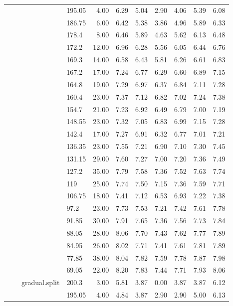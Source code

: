 \begin{longtable}{llllrrrrrrr}
   &  &  & 195.05 & 4.00 & 6.29 & 5.04 & 2.90 & 4.06 & 5.39 & 6.08 \\ 
   &  &  & 186.75 & 6.00 & 6.42 & 5.38 & 3.86 & 4.96 & 5.89 & 6.33 \\ 
   &  &  & 178.4 & 8.00 & 6.46 & 5.89 & 4.63 & 5.62 & 6.13 & 6.48 \\ 
   &  &  & 172.2 & 12.00 & 6.96 & 6.28 & 5.56 & 6.05 & 6.44 & 6.76 \\ 
   &  &  & 169.3 & 14.00 & 6.58 & 6.43 & 5.81 & 6.26 & 6.61 & 6.83 \\ 
   &  &  & 167.2 & 17.00 & 7.24 & 6.77 & 6.29 & 6.60 & 6.89 & 7.15 \\ 
   &  &  & 164.8 & 19.00 & 7.29 & 6.97 & 6.37 & 6.84 & 7.11 & 7.28 \\ 
   &  &  & 160.4 & 23.00 & 7.37 & 7.12 & 6.82 & 7.02 & 7.24 & 7.38 \\ 
   &  &  & 154.7 & 21.00 & 7.23 & 6.92 & 6.49 & 6.79 & 7.00 & 7.19 \\ 
   &  &  & 148.55 & 23.00 & 7.32 & 7.05 & 6.83 & 6.99 & 7.15 & 7.28 \\ 
   &  &  & 142.4 & 17.00 & 7.27 & 6.91 & 6.32 & 6.77 & 7.01 & 7.21 \\ 
   &  &  & 136.35 & 23.00 & 7.55 & 7.21 & 6.90 & 7.10 & 7.30 & 7.45 \\ 
   &  &  & 131.15 & 29.00 & 7.60 & 7.27 & 7.00 & 7.20 & 7.36 & 7.49 \\ 
   &  &  & 127.2 & 35.00 & 7.79 & 7.58 & 7.36 & 7.52 & 7.63 & 7.74 \\ 
   &  &  & 119 & 25.00 & 7.74 & 7.50 & 7.15 & 7.36 & 7.59 & 7.71 \\ 
   &  &  & 106.75 & 18.00 & 7.41 & 7.12 & 6.53 & 6.93 & 7.22 & 7.38 \\ 
   &  &  & 97.2 & 23.00 & 7.73 & 7.53 & 7.21 & 7.42 & 7.61 & 7.78 \\ 
   &  &  & 91.85 & 30.00 & 7.91 & 7.65 & 7.36 & 7.56 & 7.73 & 7.84 \\ 
   &  &  & 88.05 & 28.00 & 8.06 & 7.70 & 7.43 & 7.62 & 7.77 & 7.89 \\ 
   &  &  & 84.95 & 26.00 & 8.02 & 7.71 & 7.41 & 7.61 & 7.81 & 7.89 \\ 
   &  &  & 77.85 & 38.00 & 8.04 & 7.82 & 7.59 & 7.78 & 7.87 & 7.98 \\ 
   &  &  & 69.05 & 22.00 & 8.20 & 7.83 & 7.44 & 7.71 & 7.93 & 8.06 \\ 
   &  & gradual.split & 200.3 & 3.00 & 5.81 & 3.87 & 0.00 & 3.87 & 3.87 & 6.12 \\ 
   &  &  & 195.05 & 4.00 & 4.84 & 3.87 & 2.90 & 2.90 & 5.00 & 6.13 \\ 

\end{longtable}
